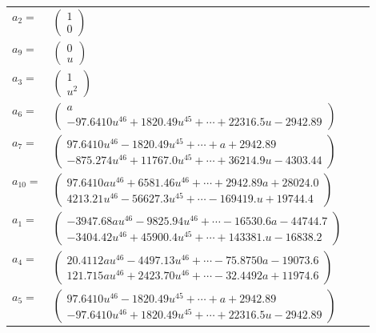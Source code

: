\documentclass[1p]{elsarticle_modified}
\theoremstyle{definition}
\begin{document}
\begin{tabular}{m{7pt} m{180pt} m{7pt} m{180pt} }
\flushright $a_{2}=$&$\begin{pmatrix}1\\0\end{pmatrix}$ \\
\flushright $a_{9}=$&$\begin{pmatrix}0\\u\end{pmatrix}$ \\
\flushright $a_{3}=$&$\begin{pmatrix}1\\u^2\end{pmatrix}$ \\
\flushright $a_{6}=$&$\begin{pmatrix}a\\-97.6410 u^{46}+1820.49 u^{45}+\cdots+22316.5 u-2942.89\end{pmatrix}$ \\
\flushright $a_{7}=$&$\begin{pmatrix}97.6410 u^{46}-1820.49 u^{45}+\cdots+a+2942.89\\-875.274 u^{46}+11767.0 u^{45}+\cdots+36214.9 u-4303.44\end{pmatrix}$ \\
\flushright $a_{10}=$&$\begin{pmatrix}97.6410 a u^{46}+6581.46 u^{46}+\cdots+2942.89 a+28024.0\\4213.21 u^{46}-56627.3 u^{45}+\cdots-169419. u+19744.4\end{pmatrix}$ \\
\flushright $a_{1}=$&$\begin{pmatrix}-3947.68 a u^{46}-9825.94 u^{46}+\cdots-16530.6 a-44744.7\\-3404.42 u^{46}+45900.4 u^{45}+\cdots+143381. u-16838.2\end{pmatrix}$ \\
\flushright $a_{4}=$&$\begin{pmatrix}20.4112 a u^{46}-4497.13 u^{46}+\cdots-75.8750 a-19073.6\\121.715 a u^{46}+2423.70 u^{46}+\cdots-32.4492 a+11974.6\end{pmatrix}$ \\
\flushright $a_{5}=$&$\begin{pmatrix}97.6410 u^{46}-1820.49 u^{45}+\cdots+a+2942.89\\-97.6410 u^{46}+1820.49 u^{45}+\cdots+22316.5 u-2942.89\end{pmatrix}$ \\

\end{tabular}
\end{document}
